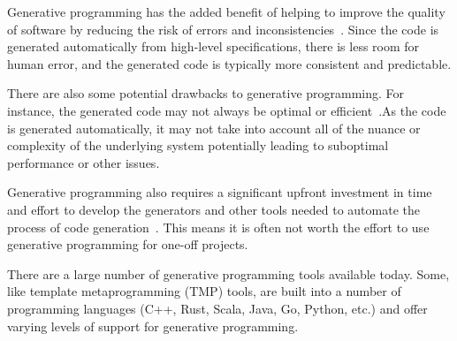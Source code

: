 Generative programming has the added benefit of helping to improve the quality 
of software by reducing the risk of errors and 
inconsistencies~\cite{Czarnecki2000,Taha2006}. Since the code is generated 
automatically from high-level specifications, there is less room for human 
error, and the generated code is typically more consistent and predictable.

There are also some potential drawbacks to generative programming. For 
instance, the generated code may not always be optimal or 
efficient~\cite{Krogdahl2004,Taha2006}.As the code is generated 
automatically, it may not take into account all of the nuance or complexity
of the underlying system potentially leading to suboptimal performance or other 
issues.

Generative programming also requires a significant upfront investment in time 
and effort to develop the generators and other tools needed to automate the 
process of code generation~\cite{Czarnecki2000,Taha2006}. This means it is 
often not worth the effort to use generative programming for one-off projects.

There are a large number of generative programming tools available today. Some, 
like template metaprogramming (TMP) tools, are built into a number of 
programming languages (C++, Rust, Scala, Java, Go, Python, etc.) and offer 
varying levels of support for generative programming. 

